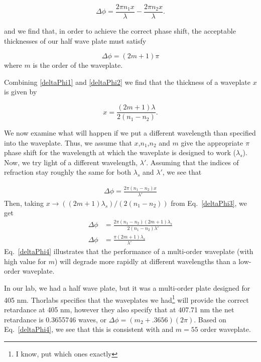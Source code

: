 \begin{equation}
\Delta \phi=\frac{2 \pi n_1 x}{\lambda} -\frac{2 \pi n_2 x}{\lambda}. \label{deltaPhi2}
\end{equation}

and we find that, in order to achieve the correct phase shift, the acceptable thicknesses of our half wave plate must satisfy

\begin{equation}
  \Delta \phi=(2m+1)\pi \label{deltaPhi1}
\end{equation}
where $m$ is the order of the waveplate.

Combining \ref{deltaPhi1} and \ref{deltaPhi2} we find that the thickness of a waveplate $x$ is given by

\begin{equation}
x=\frac{(2m+1) \lambda}{2 (n_1-n_2)}. \label{deltaPhi3}
\end{equation}


We now examine what will happen if we put a different wavelength than specified into the waveplate. Thus, we assume that $x$,$n_1$,$n_2$ and $m$ give the appropriate $\pi$ phase shift for the wavelength at which the waveplate is designed to work ($\lambda_s$). Now, we try light of a different wavelength, $\lambda'$. Assuming that the indices of refraction stay roughly the same for both $\lambda_s$ and $\lambda'$, we see that 

\begin{align}
\Delta \phi=\frac{2 \pi (n_1-n_2) x}{\lambda'} 
\end{align}
Then, taking $x\rightarrow ((2m+1) \lambda_s)/(2 (n_1-n_2))$ from Eq.\ \ref{deltaPhi3}, we get 
\begin{align}
\Delta \phi&=\frac{2 \pi (n_1-n_2) (2m+1) \lambda_s}{2 (n_1-n_2)\lambda'} \\
\Delta \phi&=\frac{\pi (2m+1) \lambda_s}{\lambda'} \label{deltaPhi4}
\end{align}
Eq.\ \ref{deltaPhi4} illustrates that the performance of a multi-order waveplate (with high value for $m$) will degrade more rapidly at different wavelengths than a low-order waveplate. 

In our lab, we had a half wave plate, but it was a multi-order plate designed for 405 nm. Thorlabs specifies that the waveplates we had\footnote{I know, put which ones exactly} will provide the correct retardance at 405 nm, however they also specify that at 407.71 nm the net retardance is 0.3655746 waves, or $\Delta \phi=(m_2+.3656) (2 \pi)$. Based on Eq.\ \ref{deltaPhi4}, we see that this is consistent with and $m=55$ order waveplate. 

